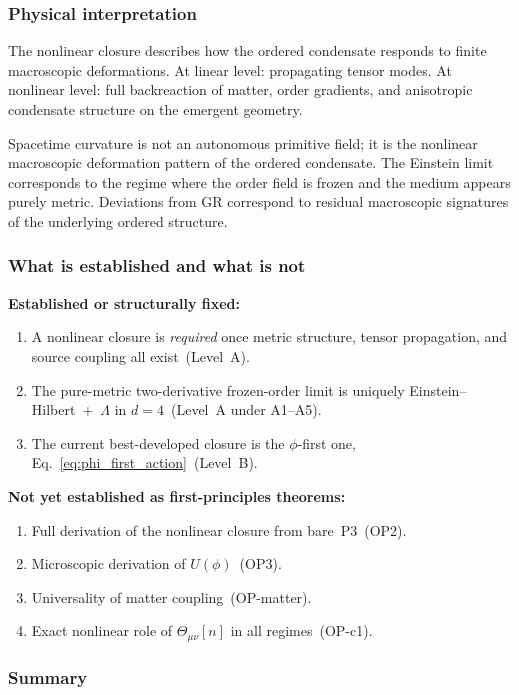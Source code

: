 \subsubsection*{Physical interpretation}

The nonlinear closure describes how the ordered condensate responds to
finite macroscopic deformations.
At linear level: propagating tensor modes.
At nonlinear level: full backreaction of matter, order gradients, and
anisotropic condensate structure on the emergent geometry.

Spacetime curvature is not an autonomous primitive field; it is the
nonlinear macroscopic deformation pattern of the ordered condensate.
The Einstein limit corresponds to the regime where the order field is
frozen and the medium appears purely metric.
Deviations from GR correspond to residual macroscopic signatures of the
underlying ordered structure.

\subsubsection*{What is established and what is not}

\textbf{Established or structurally fixed:}
\begin{enumerate}[label=(\roman*)]
  \item A nonlinear closure is \emph{required} once metric structure,
    tensor propagation, and source coupling all exist~(Level~A).
  \item The pure-metric two-derivative frozen-order limit is uniquely
    Einstein--Hilbert~+~$\Lambda$ in $d=4$~(Level~A under A1--A5).
  \item The current best-developed closure is the $\phi$-first one,
    Eq.~\eqref{eq:phi_first_action}~(Level~B).
\end{enumerate}

\textbf{Not yet established as first-principles theorems:}
\begin{enumerate}[label=(\roman*)]
  \item Full derivation of the nonlinear closure from bare~P3~(OP2).
  \item Microscopic derivation of $U(\phi)$~(OP3).
  \item Universality of matter coupling~(OP-matter).
  \item Exact nonlinear role of $\Theta_{\mu\nu}[n]$ in all
    regimes~(OP-c1).
\end{enumerate}

\subsubsection*{Summary}

